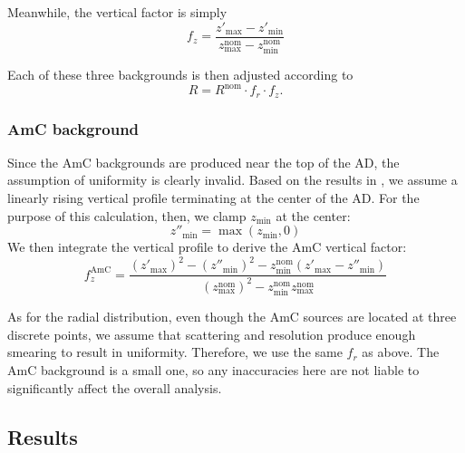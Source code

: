 \documentclass[../thesis.tex]{subfiles}
\begin{document}
Meanwhile, the vertical factor is simply
\[
  f_z = \frac{z'_{\mathrm{max}} - z'_{\mathrm{min}}}{z_{\mathrm{max}}^{\mathrm{nom}} - z_{\mathrm{min}}^{\mathrm{nom}}}
\]

Each of these three backgrounds is then adjusted according to
\[
  R = R^{\mathrm{nom}} \cdot f_r \cdot f_z.
\]

\subsubsection{AmC background}

Since the AmC backgrounds are produced near the top of the AD, the assumption of uniformity is clearly invalid. Based on the results in \cite{Gu_2016}, we assume a linearly rising vertical profile terminating at the center of the AD.
For the purpose of this calculation, then, we clamp $z_{\mathrm{min}}$ at the center:
\[
  z''_{\mathrm{min}} = \max(z_{\mathrm{min}}, 0)
\]
We then integrate the vertical profile to derive the AmC vertical factor:
\[
  f_z^{\mathrm{AmC}} = \frac{(z'_{\mathrm{max}})^2 - (z''_{\mathrm{min}})^2 - z_{\mathrm{min}}^{\mathrm{nom}} (z'_{\mathrm{max}} - z''_{\mathrm{min}})} {(z_{\mathrm{max}}^{\mathrm{nom}})^2 - z_{\mathrm{min}}^{\mathrm{nom}} z_{\mathrm{max}}^{\mathrm{nom}}} 
\]

As for the radial distribution, even though the AmC sources are located at three discrete points, we assume that scattering and resolution produce enough smearing to result in uniformity. Therefore, we use the same $f_r$ as above. The AmC background is a small one, so any inaccuracies here are not liable to significantly affect the overall analysis.

\subsection{Results}
\label{sec:cutVaryVtxCutResults}

\end{document}

